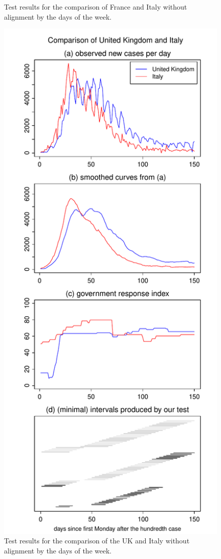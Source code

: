 \documentclass[a4paper,12pt]{article}
\numberwithin{equation}{section}
\begin{document}
{\begin{figure}[h!]
\begin{minipage}[t]{0.49\textwidth}
\caption{Test results for the comparison of France and Italy without alignment by the days of the week.}
\end{minipage}
\hspace{0.25cm}
\begin{minipage}[t]{0.49\textwidth}
\includegraphics[width=\textwidth]{plots/GBR_vs_ITA_wa}
\caption{Test results for the comparison of the UK and Italy without alignment by the days of the week.}
\end{minipage}
\end{figure}


}
\end{document}
